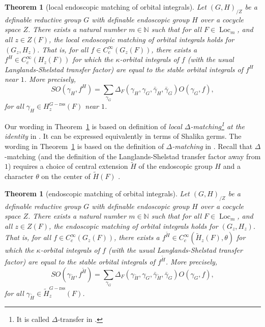 \documentclass[12pt]{amsart}
\newcommand{\op}[1]{\operatorname{#1}}
\newcommand{\ring}[1]{{\mathbb #1}}
\newcommand{\reg}{\mathrm{rss}}
\theoremstyle{plain}
\newtheorem{theorem}[thm]{Theorem}
\theoremstyle{definition}
\begin{document}
\begin{theorem}[local endoscopic matching of orbital integrals]\label{thm:local}
  Let $(G,H)_{/Z}$ be a definable reductive group $G$ with definable
  endoscopic group $H$ over a cocycle space $Z$.  There exists a
  natural number $m\in \ring{N}$ such that for all $F\in
  \op{Loc}_{m}$, and all $z\in Z(F)$, the local endoscopic matching of
  orbital integrals holds for $(G_z,H_z)$.  That is, for all $f\in
  C_c^\infty(G_z(F))$, there exists a $f^H\in C_c^\infty(H_z(F))$ for
  which the $\kappa$-orbital integrals of $f$ (with the usual
  Langlands-Shelstad transfer factor) are equal to the stable orbital
  integrals of $f^H$ near $1$. More precisely,
\[
SO(\gamma_H,f^H) = \sum_{\gamma_G} \Delta_F(\gamma_H,\gamma_G,\bar
\gamma_H,\bar \gamma_G) O(\gamma_G,f),
\]
for all $\gamma_H\in H^{G-\reg}_z(F)$ near $1$.
\end{theorem}

Our wording in Theorem~\ref{thm:local} is based on definition of {\it
  local $\Delta$-matching\footnote{It is called $\Delta$-transfer in
    \cite{LSd}.} at the identity} in \cite{LSd}.  It can be
expressed equivalently in terms of Shalika germs.  The wording in
Theorem~\ref{thm:xfer} is based on the definition of {\it
  $\Delta$-matching} in \cite{LSd}.  Recall that $\Delta$-matching
(and the definition of the Langlands-Shelstad transfer factor away
from $1$) requires a choice of central extension $\tilde H$ of the
endoscopic group $H$ and a character $\theta$ on the center of
$\tilde H(F)$ \cite[Sec.4.4]{LSxf}.

\begin{theorem}[endoscopic matching of orbital integrals]\label{thm:xfer}
  Let $(G,H)_{/Z}$ be a definable reductive group $G$ with definable
  endoscopic group $H$ over a cocycle space $Z$.  There exists a
  natural number $m\in \ring{N}$ such that for all $F\in
  \op{Loc}_{m}$, and all $z\in Z(F)$, the endoscopic matching of
  orbital integrals holds for $(G_z,H_z)$.  That is, for all $f\in
  C_c^\infty(G_z(F))$, there exists a $f^{\tilde H}\in
  C_c^\infty(\tilde H_z(F),\theta)$ for which the $\kappa$-orbital
  integrals of $f$ (with the usual Langlands-Shelstad transfer factor)
  are equal to the stable orbital integrals of $f^{\tilde H}$. More
  precisely,
\[
SO(\gamma_{\tilde H},f^{\tilde H}) = \sum_{\gamma_G}
\Delta_F(\gamma_{\tilde H},\gamma_G,\bar
\gamma_{\tilde H},\bar \gamma_G) O(\gamma_G,f),
\]
for all $\gamma_{\tilde H}\in {\tilde H}^{G-\reg}_z(F)$.
\end{theorem}
\end{document}
